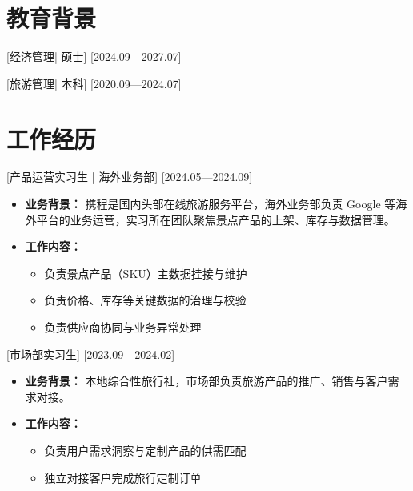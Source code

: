 \documentclass{resume}
\begin{document}

\ResumeTitle

\section{教育背景}

[\textnormal{经济管理|} 硕士]
[2024.09—2027.07]

[\textnormal{旅游管理|} 本科]
[2020.09—2024.07]

\section{工作经历}

[\textnormal{产品运营实习生 |} 海外业务部]
[2024.05—2024.09]

\begin{itemize}

\item \textbf{业务背景：} 携程是国内头部在线旅游服务平台，海外业务部负责 Google 等海外平台的业务运营，实习所在团队聚焦景点产品的上架、库存与数据管理。

\item \textbf{工作内容：}
\begin{itemize}
  \item 负责景点产品（SKU）主数据挂接与维护
  \item 负责价格、库存等关键数据的治理与校验
  \item 负责供应商协同与业务异常处理
\end{itemize}

\end{itemize}

[\textnormal{市场部实习生}]
[2023.09—2024.02]

\begin{itemize}

\item \textbf{业务背景：} 本地综合性旅行社，市场部负责旅游产品的推广、销售与客户需求对接。

\item \textbf{工作内容：}
\begin{itemize}
  \item 负责用户需求洞察与定制产品的供需匹配
  \item 独立对接客户完成旅行定制订单
\end{itemize}

\end{itemize}
\end{document}
